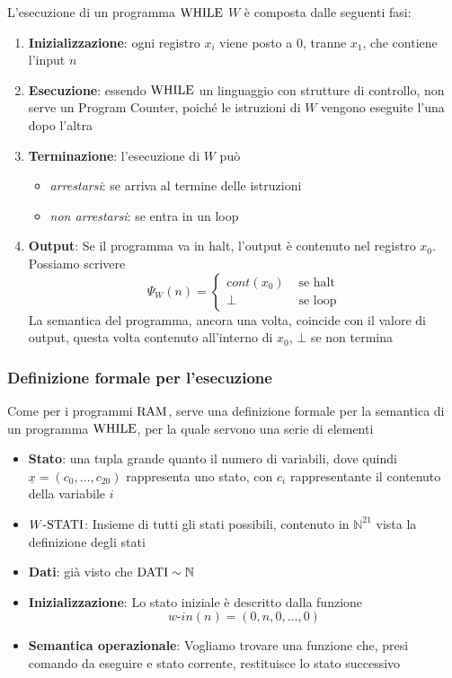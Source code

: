 L'esecuzione di un programma $\text{WHILE}$ $W$ è composta dalle seguenti fasi: 
\begin{enumerate}
	\item \textbf{Inizializzazione}: ogni registro $x_i$ viene posto a $0$, tranne $x_1$, che contiene l'input $n$
    
	\item \textbf{Esecuzione}: essendo $\text{WHILE}$ un linguaggio con strutture di controllo, non serve un Program Counter, poiché le istruzioni di $W$ vengono eseguite l'una dopo l'altra
	
    \item \textbf{Terminazione}: l'esecuzione di $W$ può 
	\begin{itemize}
		\item \textit{arrestarsi}: se arriva al termine delle istruzioni
	
    	\item \textit{non arrestarsi}: se entra in un loop
	\end{itemize}
	
    \item \textbf{Output}: Se il programma va in halt, l'output è contenuto nel registro $x_0$. Possiamo scrivere
	$$ \Psi_W (n) = \begin{cases}
		cont(x_0) & \text{ se halt} \\
		\bot & \text{ se loop}
	\end{cases}$$
    La semantica del programma, ancora una volta, coincide con il valore di output, questa volta contenuto all'interno di $x_0$, $\bot$ se non termina
\end{enumerate}

\subsubsection{Definizione formale per l'esecuzione}

Come per i programmi $\text{RAM}$, serve una definizione formale per la semantica di un programma $\text{WHILE}$, per la quale servono una serie di elementi
\begin{itemize}
	\item \textbf{Stato}: una tupla grande quanto il numero di variabili, dove quindi $\underline{x} = (c_0, \dots, c_{20})$ rappresenta uno stato, con $c_i$ rappresentante il contenuto della variabile $i$
	
    \item \textbf{$W\text{-STATI}$}: Insieme di tutti gli stati possibili, contenuto in $\mathbb{N}^{21}$ vista la definizione degli stati 
	
    \item \textbf{Dati}: già visto che $\text{DATI} \sim \mathbb{N}$
	
    \item \textbf{Inizializzazione}: Lo stato iniziale è descritto dalla funzione 
	$$ w\text{-}in(n) = (0, n, 0, \dots, 0) $$
	
    \item \textbf{Semantica operazionale}: Vogliamo trovare una funzione che, presi comando da eseguire e stato corrente, restituisce lo stato successivo
\end{itemize}

